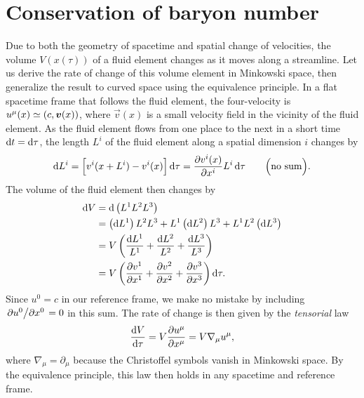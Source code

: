\section{Conservation of baryon number}

Due to both the geometry of spacetime and spatial change of velocities, the volume $V(x(\tau))$ of a fluid element changes as it moves along a streamline.
Let us derive the rate of change of this volume element in Minkowski space, then generalize the result to curved space using the equivalence principle.
In a flat spacetime frame that follows the fluid element, the four-velocity is $u^\mu(x) \simeq (c, {\bm{v}}(x))$, where $\vec{v}(x)$ is a small velocity field in the vicinity of the fluid element.
As the fluid element flows from one place to the next in a short time $\mathop{}\!\mathrm{d} t = \mathop{}\!\mathrm{d} \tau$, the length $L^i$ of the fluid element along a spatial dimension $i$ changes by
\begin{equation}
	\mathop{}\!\mathrm{d} L^i = \Big[ v^i(x+L^i) - v^i(x) \Big] \mathop{}\!\mathrm{d} \tau 
	         = \pdv{v^i(x)}{x^i} L^i \mathop{}\!\mathrm{d} \tau
	\qquad \Big( \text{no sum} \Big) .
\end{equation}
The volume of the fluid element then changes by
\begin{equation}
\begin{split}
	\dif V &= \dif \left( L^1 L^2 L^3 \right) \\
	       &= \left( \dif L^1 \right) L^2 L^3 + L^1 \left( \dif L^2 \right) L^3 + L^1 L^2 \left( \dif L^3 \right) \\
	       &= V \left( \frac{\dif L^1}{L^1} + \frac{\dif L^2}{L^2} + \frac{\dif L^3}{L^3} \right) \\
	       &= V \left( \pdv{v^1}{x^1} + \pdv{v^2}{x^2} + \pdv{v^3}{x^3} \right) \dif \tau . \\
\end{split}
\end{equation}
Since $u^0 = c$ in our reference frame, we make no mistake by including $\pdv{u^0}/{x^0} = 0$ in this sum.
The rate of change is then given by the \emph{tensorial} law
\begin{equation}
	\odv{V}{\tau} = V \pdv{u^\mu}{x^\mu} = V \nabla_\mu u^\mu ,
\label{eq:relfluid:volume_rate_change}
\end{equation}
where $\nabla_\mu = \partial_\mu$ because the Christoffel symbols vanish in Minkowski space.
By the equivalence principle, this law then holds in any spacetime and reference frame.

